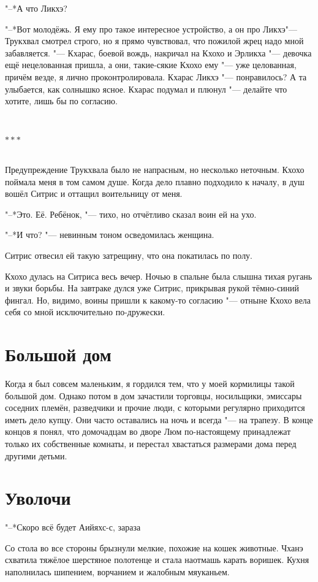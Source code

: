\documentclass[a4paper,10pt,fleqn]{book}
\newcommand{\ldotst}{\so{...}\xspace}
\newcommand{\ldotse}{\so{!..}\xspace}
\newcommand{\razd}{~\\{\centering\Large\bfseries$\ast \ast \ast$\par}~\\}
\begin{document}
"--*А что Ликхэ?

"--*Вот молодёжь.
Я ему про такое интересное устройство, а он про Ликхэ\ldotst "--- Трукхвал смотрел строго, но я прямо чувствовал, что пожилой жрец надо мной забавляется.
"--- Кхарас, боевой вождь, накричал на Кхохо и Эрликха "--- девочка ещё нецелованная пришла, а они, такие-сякие\ldotst
Кхохо ему "--- уже целованная, причём везде, я лично проконтролировала.
Кхарас Ликхэ "--- понравилось?
А та улыбается, как солнышко ясное.
Кхарас подумал и плюнул "--- делайте что хотите, лишь бы по согласию.

\razd

Предупреждение Трукхвала было не напрасным, но несколько неточным.
Кхохо поймала меня в том самом душе.
Когда дело плавно подходило к началу, в душ вошёл Ситрис и оттащил воительницу от меня.

"--*Это. Её. Ребёнок, "--- тихо, но отчётливо сказал воин ей на ухо.

"--*И что? "--- невинным тоном осведомилась женщина.

Ситрис отвесил ей такую затрещину, что она покатилась по полу.

Кхохо дулась на Ситриса весь вечер.
Ночью в спальне была слышна тихая ругань и звуки борьбы.
На завтраке дулся уже Ситрис, прикрывая рукой тёмно-синий фингал.
Но, видимо, воины пришли к какому-то согласию "--- отныне Кхохо вела себя со мной исключительно по-дружески.

\section{Большой дом}

Когда я был совсем маленьким, я гордился тем, что у моей кормилицы такой большой дом.
Однако потом в дом зачастили торговцы, носильщики, эмиссары соседних племён, разведчики и прочие люди, с которыми регулярно приходится иметь дело купцу.
Они часто оставались на ночь и всегда "--- на трапезу.
В конце концов я понял, что домочадцам во дворе Люм по-настоящему принадлежат только их собственные комнаты, и перестал хвастаться размерами дома перед другими детьми.

\section{Уволочи}

"--*Скоро всё будет\ldotst
Аийяхс-с, зараза\ldotse

Со стола во все стороны брызнули мелкие, похожие на кошек животные.
Чханэ схватила тяжёлое шерстяное полотенце и стала наотмашь карать воришек.
Кухня наполнилась шипением, ворчанием и жалобным мяуканьем.
\end{document}
